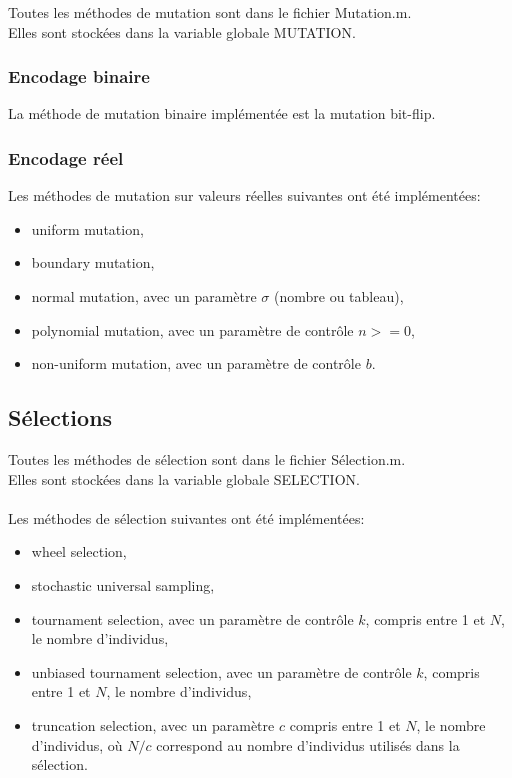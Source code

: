\documentclass[12pt, letterpaper]{article}
\begin{document}
Toutes les méthodes de mutation sont dans le fichier Mutation.m.\\
Elles sont stockées dans la variable globale MUTATION.

\subsubsection{Encodage binaire}

La méthode de mutation binaire implémentée est la mutation bit-flip.

\subsubsection{Encodage réel}

Les méthodes de mutation sur valeurs réelles suivantes ont été implémentées:

\begin{itemize}
\item uniform mutation,
  
\item boundary mutation,
  
\item normal mutation, avec un paramètre $\sigma$ (nombre ou tableau),
  
\item polynomial mutation, avec un paramètre de contrôle $n >= 0$,
  
\item non-uniform mutation, avec un paramètre de contrôle $b$.
\end{itemize}

\subsection{Sélections}

Toutes les méthodes de sélection sont dans le fichier Sélection.m.\\
Elles sont stockées dans la variable globale SELECTION.
\\
\\
Les méthodes de sélection suivantes ont été implémentées:

\begin{itemize}
  
\item wheel selection,
	
\item stochastic universal sampling,
	
\item tournament selection, avec un paramètre de contrôle $k$, compris
  entre 1 et $N$, le nombre d'individus,
	
\item unbiased tournament selection, avec un paramètre de contrôle $k$,
  compris entre 1 et $N$, le nombre d'individus,
	
\item truncation selection, avec un paramètre $c$ compris entre 1 et $N$,
  le nombre d'individus, où $N/c$ correspond au nombre d'individus
  utilisés dans la sélection.
\end{itemize}
\end{document}

